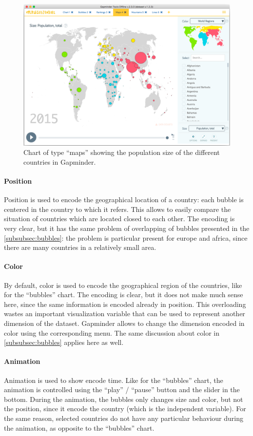 \begin{figure}[h]
	\centering
	\includegraphics[width=0.95\columnwidth]{figures/maps}
	\caption{Chart of type ``maps'' showing the population size of the different countries in Gapminder.}
	\label{fig:maps}
\end{figure}

\paragraph{Position}
Position is used to encode the geographical location of a country:
each bubble is centered in the country to which it refers.
This allows to easily compare the situation of countries which are located closed to each other.
The encoding is very clear, but it has the same problem of overlapping of bubbles presented in the \cref{subsubsec:bubbles}:
the problem is particular present for europe and africa, since there are many countries in a relatively small area.

\paragraph{Color}
By default, color is used to encode the geographical region of the countries, like for the ``bubbles'' chart.
The encoding is clear, but it does not make much sense here, since the same information is encoded already in position.
This overloading wastes an important visualization variable that can be used to represent another dimension of the dataset.
Gapminder allows to change the dimension encoded in color using the corresponding menu.
The same discussion about color in \cref{subsubsec:bubbles} applies here as well.

\paragraph{Animation}
Animation is used to show encode time.
Like for the ``bubbles'' chart, the animation is controlled using the ``play'' / ``pause'' button and the slider in the bottom.
During the animation, the bubbles only changes size and color, but not the position, since it encode the country (which is the independent variable).
For the same reason, selected countries do not have any particular behaviour during the animation, as opposite to the ``bubbles'' chart.


